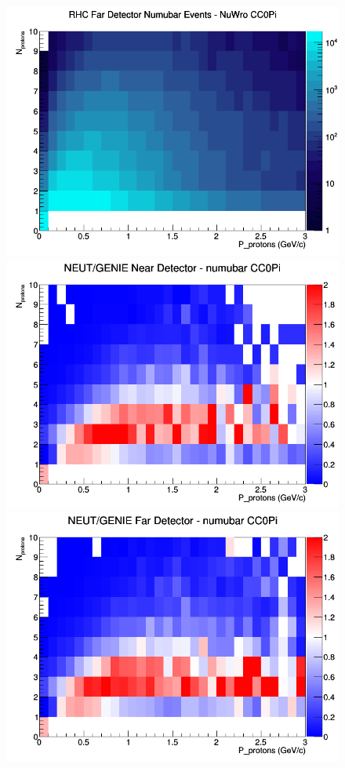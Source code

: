 \begin{figure}[h]
\endminipage
{}
\includegraphics[width=\linewidth]{N_P/nominal/protons/CC0Pi_RHC_FD_numubar_N_P_NuWro.png}
\endminipage
\newline
{}
\includegraphics[width=\linewidth]{N_P/nominal/protons/ratios/CC0Pi_NEUT_GENIE_numubar_near_N_P.png}
\endminipage
{}
\includegraphics[width=\linewidth]{N_P/nominal/protons/ratios/CC0Pi_NEUT_GENIE_numubar_far_N_P.png}

\end{figure}
